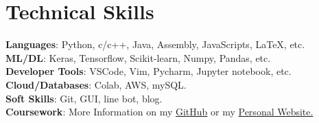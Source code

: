 \documentclass[a4paper,11pt]{article}
\makeatletter
\newcommand{\resumeSubheading}[4]{
\vspace{0.5mm}\item
    \begin{tabular*}{0.98\textwidth}[t]{l@{\extracolsep{\fill}}r}
        \textbf{#1} & \textit{\footnotesize{#4}} \\
        \textit{\footnotesize{#3}} &  \footnotesize{#2}\\
    \end{tabular*}
    \vspace{-2.4mm}
}
\newcommand{\resumeSubHeadingListStart}{\begin{itemize}[leftmargin=*,labelsep=0mm]}
\newcommand{\resumeSubHeadingListEnd}{\end{itemize}\vspace{2mm}}
\makeatother
\begin{document}
  \section{\textbf{Technical Skills}}
  \begin{itemize}[leftmargin=0.05in, label={}]
    \vspace{1.0mm}
    {\item{
      \textbf{Languages}{: Python, c/c++, Java, Assembly, JavaScripts, LaTeX, etc.} \\
      \textbf{ML/DL}{: Keras, Tensorflow, Scikit-learn, Numpy, Pandas, etc.} \\
      \textbf{Developer Tools}{: VSCode, Vim, Pycharm, Jupyter notebook, etc.} \\
      \textbf{Cloud/Databases}{: Colab, AWS, mySQL.} \\
      \textbf{Soft Skills}{: Git, GUI, line bot, blog.} \\
      \textbf{Coursework}{: More Information on my \href{https://github.com/1chooo}{GitHub} or my \href{https://sites.google.com/g.ncu.edu.tw/1chooo}{Personal Website.}} \\
    }}


  
 \end{itemize}
 \vspace{-16pt}
\end{document}
